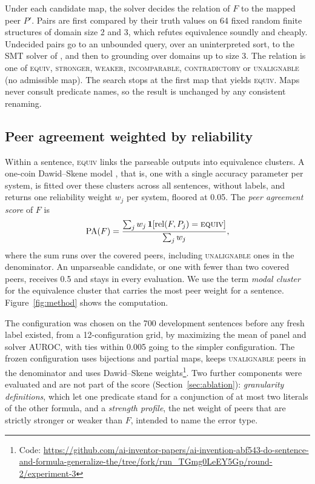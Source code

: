 \documentclass[11pt,letterpaper]{article}
\newcommand{\EQ}{\textsc{equiv}}
\begin{document}
Under each candidate map, the solver decides the relation of $F$ to the mapped peer $P'$. Pairs are first compared by their truth values on 64 fixed random finite structures of domain size 2 and 3, which refutes equivalence soundly and cheaply. Undecided pairs go to an unbounded query, over an uninterpreted sort, to the SMT solver of \citet{Moura2008}, and then to grounding over domains up to size 3. The relation is one of \EQ, \textsc{stronger}, \textsc{weaker}, \textsc{incomparable}, \textsc{contradictory} or \textsc{unalignable} (no admissible map). The search stops at the first map that yields \EQ. Maps never consult predicate names, so the result is unchanged by any consistent renaming.

\subsection{Peer agreement weighted by reliability}

Within a sentence, \EQ{} links the parseable outputs into equivalence clusters. A one-coin Dawid--Skene model \citep{Dawid1979}, that is, one with a single accuracy parameter per system, is fitted over these clusters across all sentences, without labels, and returns one reliability weight $w_j$ per system, floored at 0.05. The \emph{peer agreement score} of $F$ is
\begin{equation}
  \mathrm{PA}(F) = \frac{\sum_{j} w_j \,\mathbf{1}[\mathrm{rel}(F, P_j) = \textsc{equiv}]}{\sum_{j} w_j},
\end{equation}
where the sum runs over the covered peers, including \textsc{unalignable} ones in the denominator. An unparseable candidate, or one with fewer than two covered peers, receives 0.5 and stays in every evaluation. We use the term \emph{modal cluster} for the equivalence cluster that carries the most peer weight for a sentence. Figure~\ref{fig:method} shows the computation.

The configuration was chosen on the 700 development sentences before any fresh label existed, from a 12-configuration grid, by maximizing the mean of panel and solver AUROC, with ties within 0.005 going to the simpler configuration. The frozen configuration uses bijections and partial maps, keeps \textsc{unalignable} peers in the denominator and uses Dawid--Skene weights\footnote{Code: \url{https://github.com/ai-inventor-papers/ai-invention-abf543-do-sentence-and-formula-generalize-the/tree/fork/run_TGmg0LeEY5Gp/round-2/experiment-3}}. Two further components were evaluated and are not part of the score (Section~\ref{sec:ablation}): \emph{granularity definitions}, which let one predicate stand for a conjunction of at most two literals of the other formula, and a \emph{strength profile}, the net weight of peers that are strictly stronger or weaker than $F$, intended to name the error type.
\end{document}

